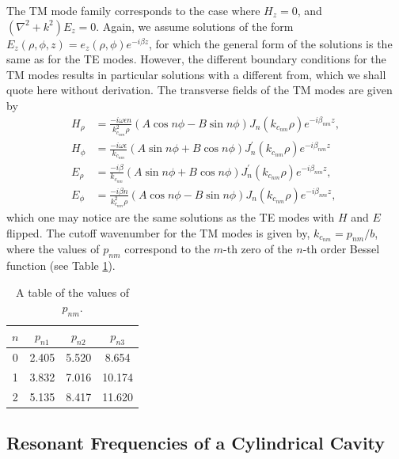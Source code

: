 The TM mode family corresponds to the case where $H_z=0$, and $(\nabla^2 +k^2)E_z=0$. Again, we assume solutions of the form $E_z(\rho,\phi,z)=e_z(\rho,\phi)e^{-i\beta z}$, for which the general form of the solutions is the same as for the TE modes. However, the different boundary conditions for the TM modes results in particular solutions with a different from, which we shall quote here without derivation. The transverse fields of the TM modes are given by 
\begin{align}
    H_\rho &=\frac{-i\omega\epsilon n}{k_{c_{nm}}^2 \rho}(A\cos{n\phi}-B\sin{n\phi})J_n(k_{c_{nm}}\rho)e^{-i\beta_{nm} z},\\
    H_\phi &=\frac{-i\omega\epsilon}{k_{c_{nm}}}(A\sin{n\phi}+B\cos{n\phi})J_n^\prime(k_{c_{nm}}\rho)e^{-i\beta_{nm} z}\\
    E_\rho &= \frac{-i\beta }{k_{c_{nm}}}(A\sin{n\phi}+B\cos{n\phi})J_n^\prime(k_{c_{nm}}\rho)e^{-i\beta_{nm} z},\\
    E_\phi &=\frac{-i\beta n}{k_{c_{nm}}^2\rho}(A\cos{n\phi}-B\sin{n\phi})J_n(k_{c_{nm}}\rho)e^{-i\beta_{nm} z},
\end{align}
which one may notice are the same solutions as the TE modes with $H$ and $E$ flipped. The cutoff wavenumber for the TM modes is given by, $k_{c_{nm}}=p_{nm}/b$, where the values of $p_{nm}$ correspond to the $m$-th zero of the $n$-th order Bessel function (see Table \ref{tab:chap6-bessel-roots}).

\begin{table}[htbp]
    \centering
    \caption{\label{tab:chap6-bessel-roots} A table of the values of $p_{nm}$.}
    \begin{tabular}{c c c c }
        \hline
        $n$ & $p_{n1}$ & $p_{n2}$ & $p_{n3}$ \\
        \hline
        0 & 2.405 & 5.520 & 8.654\\
        1 & 3.832 & 7.016 & 10.174\\
        2 & 5.135 & 8.417 & 11.620\\
        \hline
    \end{tabular}
\end{table}

\subsection{Resonant Frequencies of a Cylindrical Cavity}

